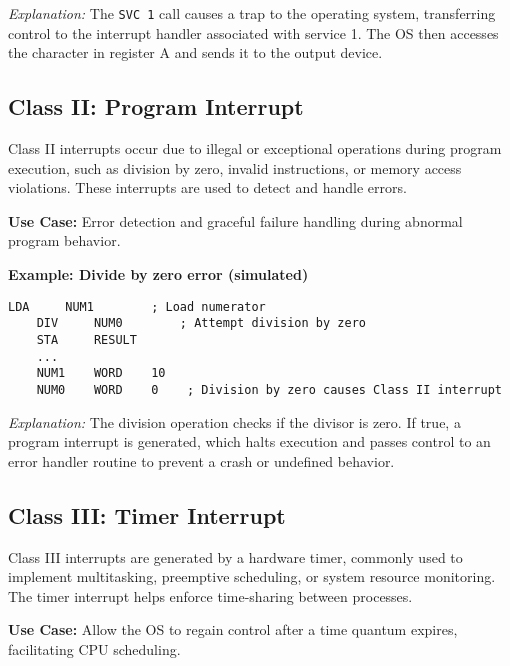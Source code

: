 \documentclass[12pt]{article}
\begin{document}
    \textit{Explanation:} The \texttt{SVC 1} call causes a trap to the operating system, transferring control to the interrupt handler associated with service 1. The OS then accesses the character in register A and sends it to the output device.
    
    \vspace{0.2cm}
    
    \subsection*{Class II: Program Interrupt}
    
    Class II interrupts occur due to illegal or exceptional operations during program execution, such as division by zero, invalid instructions, or memory access violations. These interrupts are used to detect and handle errors.
    
    \textbf{Use Case:} Error detection and graceful failure handling during abnormal program behavior.
    
    \textbf{Example: Divide by zero error (simulated)}
    
    \begin{lstlisting}[language={[x86masm]Assembler}]
    LDA     NUM1        ; Load numerator
    DIV     NUM0        ; Attempt division by zero
    STA     RESULT
    ...
    NUM1    WORD    10
    NUM0    WORD    0    ; Division by zero causes Class II interrupt
    \end{lstlisting}
    
    \textit{Explanation:} The division operation checks if the divisor is zero. If true, a program interrupt is generated, which halts execution and passes control to an error handler routine to prevent a crash or undefined behavior.
    
    \vspace{0.2cm}
    
    \subsection*{Class III: Timer Interrupt}
    
    Class III interrupts are generated by a hardware timer, commonly used to implement multitasking, preemptive scheduling, or system resource monitoring. The timer interrupt helps enforce time-sharing between processes.
    
    \textbf{Use Case:} Allow the OS to regain control after a time quantum expires, facilitating CPU scheduling.
    
\end{document}
